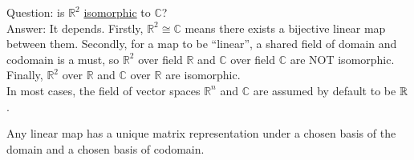 \begin{example}
Question: is $\mathbb{R}^2$ \hyperref[def:isomorphism]{isomorphic} to $\mathbb{C}$?\\
Answer: It depends.
Firstly, $\mathbb{R}^2 \cong \mathbb{C}$ means there exists a bijective linear map between them.
Secondly, for a map to be ``linear'', a shared field of domain and codomain is a must, so $\mathbb{R}^2$ over field $\mathbb{R}$ and $\mathbb{C}$ over field $\mathbb{C}$ are NOT isomorphic.
Finally, $\mathbb{R}^2$ over $\mathbb{R}$ and $\mathbb{C}$ over $\mathbb{R}$ are isomorphic.\\
In most cases, the field of vector spaces $\mathbb{R}^n$ and $\mathbb{C}$ are assumed by default to be $\mathbb{R}$.
\end{example}

\begin{proposition} \label{matrix of a linear map}
Any linear map has a unique matrix representation under a chosen basis of the domain and a chosen basis of codomain.
\end{proposition}

